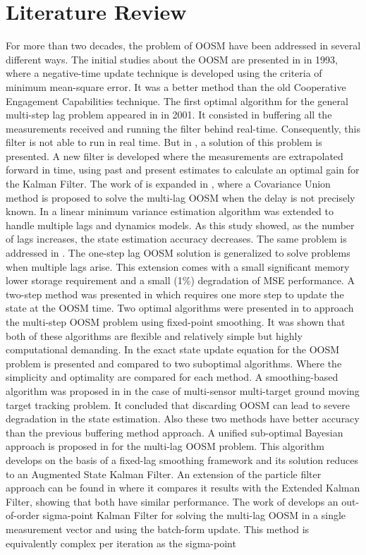 \pagebreak
\section{Literature Review}
For more than two decades, the problem of OOSM have been addressed in several different ways. The initial studies about the OOSM are presented in \cite{Hilton1993} in 1993, where a negative-time update technique is developed using the criteria of minimum mean-square error. It was a better method than the old Cooperative Engagement Capabilities technique. The first optimal algorithm for the general multi-step lag problem appeared in \cite{Nettleton2001} in 2001. It consisted in buffering all the measurements received and running the filter behind real-time. Consequently, this filter is not able to run in real time. But in \cite{Larsen1998}, a solution of this problem is presented. A new filter is developed where the measurements are extrapolated forward in time, using past and present estimates to calculate an optimal gain for the Kalman Filter. The work of \cite{Larsen1998} is expanded in \cite{Julier2005}, where a Covariance Union method is proposed to solve the multi-lag OOSM when the delay is not precisely known. In \cite{Mallick2001} a linear minimum variance estimation algorithm was extended to handle multiple lags and dynamics models. As this study showed, as the number of lags increases, the state estimation accuracy decreases. The same problem is addressed in \cite{Bar-Shalom2002a}. The one-step lag OOSM solution is generalized to solve problems when multiple lags arise. This extension comes with a small significant memory lower storage requirement and a small (1\%) degradation of MSE performance. A two-step method was presented in \cite{Lanzkron2004} which requires one more step to update the state at the OOSM time. Two optimal algorithms were presented in \cite{Zhang2002} to approach the multi-step OOSM problem using fixed-point smoothing. It was shown that both of these algorithms are flexible and relatively simple but highly computational demanding. In \cite{Bar-Shalom2002} the exact state update equation for the OOSM problem is presented and compared to two suboptimal algorithms. Where the simplicity and optimality are compared for each method. A smoothing-based algorithm was proposed in \cite{Mallick2002} in the case of multi-sensor multi-target ground moving target tracking problem. It concluded that discarding OOSM can lead to severe degradation in the state estimation. Also these two methods have better accuracy than the previous buffering method approach. A unified sub-optimal Bayesian approach is proposed in \cite{Challa2002} for the multi-lag OOSM problem. This algorithm develops on the basis of a fixed-lag smoothing framework and its solution reduces to an Augmented State Kalman Filter. An extension of the particle filter approach can be found in \cite{Orton2005} where it compares it results with the Extended Kalman Filter, showing that both have similar performance. The work of \cite{Plett2007} develops an out-of-order sigma-point Kalman Filter for solving the multi-lag OOSM in a single measurement vector and using the batch-form update. This method is equivalently complex per iteration as the sigma-point 